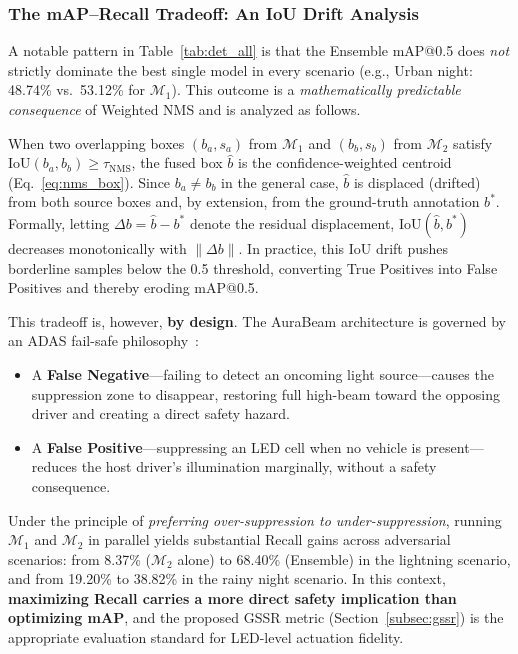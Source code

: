 \documentclass[pdflatex,sn-mathphys-num]{sn-jnl}%
\theoremstyle{thmstyleone}%
\theoremstyle{thmstyletwo}%
\theoremstyle{thmstylethree}%
\begin{document}
\subsubsection*{The mAP--Recall Tradeoff: An IoU Drift Analysis}
\label{subsubsec:tradeoff}

A notable pattern in Table~\ref{tab:det_all} is that the Ensemble
mAP@0.5 does \emph{not} strictly dominate the best single model in
every scenario (e.g., Urban night: 48.74\% vs.\ 53.12\% for
$\mathcal{M}_1$). This outcome is a \emph{mathematically predictable
consequence} of Weighted NMS and is analyzed as follows.

When two overlapping boxes $(b_a, s_a)$ from $\mathcal{M}_1$ and
$(b_b, s_b)$ from $\mathcal{M}_2$ satisfy
$\mathrm{IoU}(b_a, b_b) \geq \tau_{\mathrm{NMS}}$, the fused box
$\hat{b}$ is the confidence-weighted centroid
(Eq.~\eqref{eq:nms_box}). Since $b_a \neq b_b$ in the general case,
$\hat{b}$ is displaced (drifted) from both source boxes and, by
extension, from the ground-truth annotation $b^*$. Formally, letting
$\Delta b = \hat{b} - b^*$ denote the residual displacement,
$\mathrm{IoU}(\hat{b}, b^*)$ decreases monotonically with
$\|\Delta b\|$. In practice, this IoU drift pushes borderline samples
below the 0.5 threshold, converting True Positives into False
Positives and thereby eroding mAP@0.5.

This tradeoff is, however, \textbf{by design}. The AuraBeam
architecture is governed by an ADAS fail-safe
philosophy~\cite{ISO26262_2018}:
\begin{itemize}[nosep]
  \item A \textbf{False Negative}---failing to detect an oncoming
    light source---causes the suppression zone to disappear, restoring
    full high-beam toward the opposing driver and creating a direct
    safety hazard.
  \item A \textbf{False Positive}---suppressing an LED cell when no
    vehicle is present---reduces the host driver's illumination
    marginally, without a safety consequence.
\end{itemize}
Under the principle of \emph{preferring over-suppression to
under-suppression}, running $\mathcal{M}_1$ and $\mathcal{M}_2$ in
parallel yields substantial Recall gains across adversarial scenarios:
from 8.37\% ($\mathcal{M}_2$ alone) to 68.40\% (Ensemble) in the
lightning scenario, and from 19.20\% to 38.82\% in the rainy night
scenario. In this context, \textbf{maximizing Recall carries a more
direct safety implication than optimizing mAP}, and the proposed GSSR
metric (Section~\ref{subsec:gssr}) is the appropriate evaluation
standard for LED-level actuation fidelity.
\end{document}
